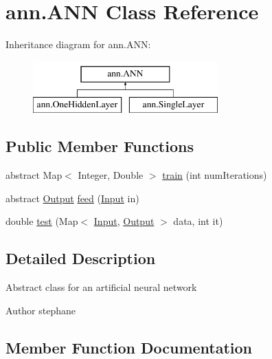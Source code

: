 \hypertarget{classann_1_1_a_n_n}{}\section{ann.\+A\+NN Class Reference}
\label{classann_1_1_a_n_n}
Inheritance diagram for ann.\+A\+NN\+:\begin{figure}[H]
\begin{center}
\leavevmode
\includegraphics[height=2.000000cm]{classann_1_1_a_n_n}
\end{center}
\end{figure}
\subsection*{Public Member Functions}
\begin{DoxyCompactItemize}
\item 
abstract Map$<$ Integer, Double $>$ \hyperlink{classann_1_1_a_n_n_a9e4c633b9b365c89245bbb441c86d71c}{train} (int num\+Iterations)
\item 
abstract \hyperlink{classann_1_1_output}{Output} \hyperlink{classann_1_1_a_n_n_adc3da5c04b719a2d7c93ef5af2e898b7}{feed} (\hyperlink{classann_1_1_input}{Input} in)
\item 
double \hyperlink{classann_1_1_a_n_n_aa7ab72312b84e639aa84b6fbee5c9df1}{test} (Map$<$ \hyperlink{classann_1_1_input}{Input}, \hyperlink{classann_1_1_output}{Output} $>$ data, int it)
\end{DoxyCompactItemize}


\subsection{Detailed Description}
Abstract class for an artificial neural network \begin{DoxyAuthor}{Author}
stephane 
\end{DoxyAuthor}


\subsection{Member Function Documentation}
\mbox{\label{classann_1_1_a_n_n_adc3da5c04b719a2d7c93ef5af2e898b7}} 
